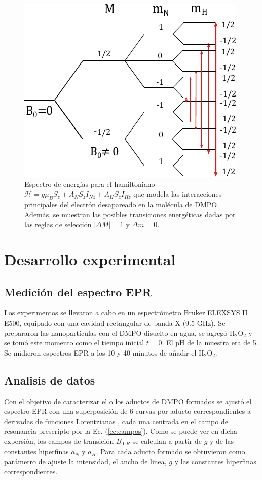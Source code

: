 \documentclass[aps,prl,reprint,superscriptaddress,showkeys]{revtex4-2}
\begin{document}
\begin{figure}[ht]
    \centering
    \includegraphics[width=0.675\linewidth]{spliteo.pdf}
    \caption{\centering Espectro de energías para el hamiltoniano $ \mathcal{H} = g \mu_B S_z + A_N S_z I_{Nz} + A_H S_z I_{Hz}$ que modela las interacciones principales del electrón desapareado en la molécula de DMPO. Además, se muestran las posibles transiciones energéticas dadas por las reglas de selección $|\Delta M| = 1$ y $\Delta m = 0$.}
    \label{fig:spliteo}
\end{figure}


\section{Desarrollo experimental}
\subsection{Medición del espectro EPR}
Los experimentos se llevaron a cabo en un espectrómetro Bruker ELEXSYS II E500, equipado con una cavidad rectangular de banda X (9.5 GHz). Se prepararon las nanopartículas con el DMPO disuelto en agua, se agregó H$_2$O$_2$ y se tomó este momento como el tiempo inicial $t=0$. El pH de la muestra era de 5. Se midieron  espectros EPR a los 10 y 40 minutos de añadir el H$_2$O$_2$.

\subsection{Analisis de datos}
Con el objetivo de caracterizar el o los aductos de DMPO formados se ajustó el espectro EPR con una superposición de 6 curvas por aducto correspondientes a derivadas de funciones Lorentzianas \cite{bales_epr_2009}, cada una centrada en el campo de resonancia prescripto por la Ec. (\ref*{ec:campos}). Como se puede ver en dicha expersión, los campos de transición $B_{0,R}$ se calculan a partir de $g$ y de las constantes hiperfinas $a_N$ y $a_H$. Para cada aducto formado se obtuvieron como parámetro de ajuste la intensidad, el ancho de linea, $g$ y las constantes hiperfinas correspondientes. 
\end{document}
